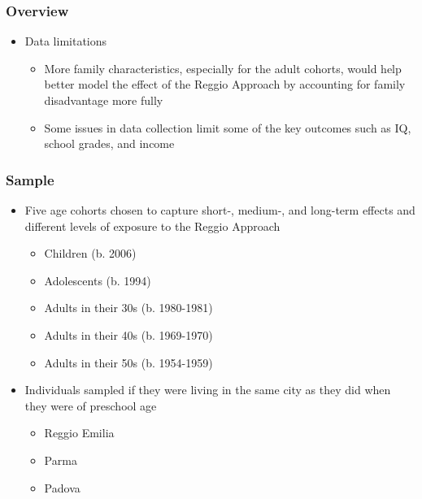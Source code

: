 \documentclass[static]{JJH-Beamer_PAGENOS}
\begin{document}
\begin{frame}
\frametitle{Overview}
\begin{itemize}
	\item Data limitations
	\begin{itemize}
		\item More family characteristics, especially for the adult cohorts, would help better model the effect of the Reggio Approach by accounting for family disadvantage more fully
		\item Some issues in data collection limit some of the key outcomes such as IQ, school grades, and income
	\end{itemize}
\end{itemize}
\end{frame}

\begin{frame}
\frametitle{Sample}
\begin{itemize}
	\item Five age cohorts chosen to capture short-, medium-, and long-term effects and different levels of exposure to the Reggio Approach
	\begin{itemize}
		\item Children (b. 2006)
		\item Adolescents (b. 1994)
		\item Adults in their 30s (b. 1980-1981)
		\item Adults in their 40s (b. 1969-1970)
		\item Adults in their 50s (b. 1954-1959)
	\end{itemize}
	\item Individuals sampled if they were living in the same city as they did when they were of preschool age
		\begin{itemize}
			\item Reggio Emilia
			\item Parma
			\item Padova
		\end{itemize}
\end{itemize}
\end{frame}




\end{document}
